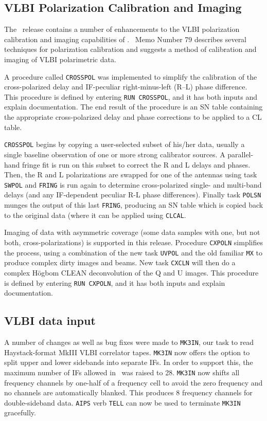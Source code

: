 \subsection{VLBI Polarization Calibration and Imaging}

   The \RELEASENAME\ release contains a number of enhancements to the
VLBI polarization calibration and imaging capabilities of
\hbox{\AIPS}.  \AIPS\ Memo Number 79 describes several techniques for
polarization calibration and suggests a method of calibration and
imaging of VLBI polarimetric data.

   A procedure called {\tt CROSSPOL} was implemented to simplify the
calibration of the cross-polarized delay and IF-peculiar
right-minus-left (R--L) phase difference.  This procedure is defined
by entering {\tt RUN CROSSPOL}, and it has both inputs and explain
documentation.  The end result of the procedure is an SN table
containing the appropriate cross-polarized delay and phase corrections
to be applied to a CL table.

   {\tt CROSSPOL} begins by copying a user-selected subset of his/her
data, usually a single baseline observation of one or more strong
calibrator sources.  A parallel-hand fringe fit is run on this subset
to correct the R and L delays and phases.  Then, the R and L
polarizations are swapped for one of the antennas using task {\tt
SWPOL} and {\tt FRING} is run again to determine cross-polarized
single- and multi-band delays (and any IF-dependent peculiar R-L phase
differences).  Finally task {\tt POLSN} munges the output of this last
{\tt FRING}, producing an SN table which is copied back to the
original data (where it can be applied using \hbox{{\tt CLCAL}}.

   Imaging of data with asymmetric coverage (some data samples with
one, but not both, cross-polarizations) is supported in this release.
Procedure {\tt CXPOLN} simplifies the process, using a combination of
the new task {\tt UVPOL} and the old familiar {\tt MX} to produce
complex dirty images and beams.  New task {\tt CXCLN} will then do a
complex H\"ogbom CLEAN deconvolution of the Q and U images.  This
procedure is defined by entering {\tt RUN CXPOLN}, and it has both
inputs and explain documentation.

\subsection{VLBI data input}

A number of changes as well as bug fixes were made to {\tt MK3IN}, our
task to read Haystack-format MkIII VLBI correlator tapes.  {\tt MK3IN}
now offers the option to split upper and lower sidebands into separate
IFs.  In order to support this, the maximum number of IFs allowed in
\AIPS\ was raised to 28.  {\tt MK3IN} now shifts all frequency
channels by one-half of a frequency cell to avoid the zero frequency
and no channels are automatically blanked.  This produces 8 frequency
channels for double-sideband data.  {\tt AIPS} verb {\tt TELL} can now
be used to terminate {\tt MK3IN} gracefully.


